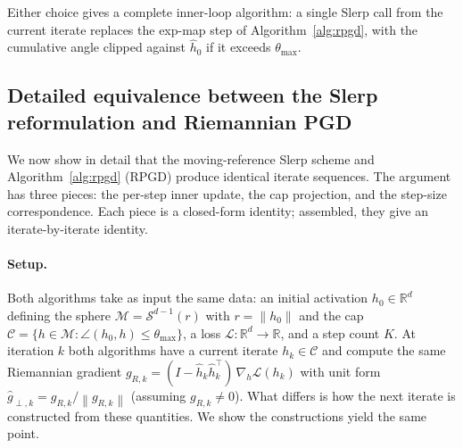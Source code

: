 \documentclass[11pt]{article}
\newcommand{\R}{\mathbb{R}}
\newcommand{\hh}{\hat h}
\newcommand{\thmax}{\theta_{\max}}
\newcommand{\norm}[1]{\left\lVert#1\right\rVert}
\begin{document}
Either choice gives a complete inner-loop algorithm: a single Slerp call from the current iterate replaces the exp-map step of Algorithm~\ref{alg:rpgd}, with the cumulative angle clipped against $\hh_0$ if it exceeds $\thmax$.

\subsection*{Detailed equivalence between the Slerp reformulation and Riemannian PGD}

We now show in detail that the moving-reference Slerp scheme and Algorithm~\ref{alg:rpgd} (RPGD) produce identical iterate sequences. The argument has three pieces: the per-step inner update, the cap projection, and the step-size correspondence. Each piece is a closed-form identity; assembled, they give an iterate-by-iterate identity.

\paragraph{Setup.} Both algorithms take as input the same data: an initial activation $h_0 \in \R^d$ defining the sphere $\mathcal{M} = \mathcal{S}^{d-1}(r)$ with $r = \norm{h_0}$ and the cap $\mathcal{C} = \{h \in \mathcal{M} : \angle(h_0, h) \le \thmax\}$, a loss $\mathcal{L}: \R^d \to \R$, and a step count $K$. At iteration $k$ both algorithms have a current iterate $h_k \in \mathcal{C}$ and compute the same Riemannian gradient $g_{R,k} = (I - \hh_k\hh_k^\top)\,\nabla_h\mathcal{L}(h_k)$ with unit form $\hat g_{\perp,k} = g_{R,k}/\norm{g_{R,k}}$ (assuming $g_{R,k} \neq 0$). What differs is how the next iterate is constructed from these quantities. We show the constructions yield the same point.
\end{document}
